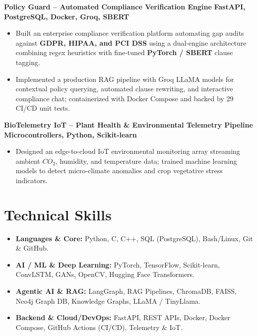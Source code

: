 \documentclass[10pt,a4paper]{article}
\begin{document}
\vspace{2pt}
\noindent
\textbf{Policy Guard -- Automated Compliance Verification Engine} \hfill \textbf{FastAPI, PostgreSQL, Docker, Groq, SBERT}
\begin{itemize}
  \item Built an enterprise compliance verification platform automating gap audits against \textbf{GDPR, HIPAA, and PCI DSS} using a dual-engine architecture combining regex heuristics with fine-tuned \textbf{PyTorch / SBERT} clause tagging.
  \item Implemented a production RAG pipeline with Groq LLaMA models for contextual policy querying, automated clause rewriting, and interactive compliance chat; containerized with Docker Compose and backed by 29 CI/CD unit tests.
\end{itemize}

\vspace{2pt}
\noindent
\textbf{BioTelemetry IoT -- Plant Health \& Environmental Telemetry Pipeline} \hfill \textbf{Microcontrollers, Python, Scikit-learn}
\begin{itemize}
  \item Designed an edge-to-cloud IoT environmental monitoring array streaming ambient $CO_2$, humidity, and temperature data; trained machine learning models to detect micro-climate anomalies and crop vegetative stress indicators.
\end{itemize}
\vspace{-3pt}

\section{Technical Skills}
\begin{itemize}[leftmargin=1.15em]
  \item \textbf{Languages \& Core:} Python, C, C++, SQL (PostgreSQL), Bash/Linux, Git \& GitHub.
  \item \textbf{AI / ML \& Deep Learning:} PyTorch, TensorFlow, Scikit-learn, ConvLSTM, GANs, OpenCV, Hugging Face Transformers.
  \item \textbf{Agentic AI \& RAG:} LangGraph, RAG Pipelines, ChromaDB, FAISS, Neo4j Graph DB, Knowledge Graphs, LLaMA / TinyLlama.
  \item \textbf{Backend \& Cloud/DevOps:} FastAPI, REST APIs, Docker, Docker Compose, GitHub Actions (CI/CD), Telemetry \& IoT.
\end{itemize}
\vspace{-3pt}
\end{document}
